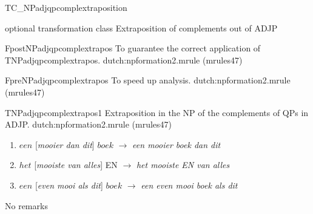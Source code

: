 \begin{mruleclass}{TC\_NPadjqpcomplextraposition}
\begin{classdescr}
\kind optional transformation class
\classtask Extraposition 
of complements out of ADJP 
\classremarks
\begin{filters}

\begin{members}
\begin{member}
 FpostNPadjqpcomplextrapos
 To guarantee the correct application of TNPadjqpcomplextrapos.
\file dutch:npformation2.mrule (mrules47)
\end{member}
\end{members}
\end{filters}
\begin{speedrules}
\begin{members}
\begin{member}
 FpreNPadjqpcomplextrapos
 To speed up analysis.
\file dutch:npformation2.mrule (mrules47)
\end{member}
\end{members}
\end{speedrules}

\noplannedrules

\norulesnotince


\end{classdescr}

\begin{members}
\begin{member}
 TNPadjqpcomplextrapos1
 Extraposition in the NP of the complements of QPs in 
ADJP.
\file dutch:npformation2.mrule (mrules47)
\semantics \nosemantics
\example
\begin{enumerate}
  \item 
$een$ [{\em mooier dan dit}] $boek$
$\rightarrow$
{\em  een mooier boek dan dit}
  \item
$het$ [{\em mooiste van alles}] EN 
$\rightarrow$
{\em het mooiste EN van alles}
  \item
 $een$ [{\em even mooi als dit}] $boek$ 
$\rightarrow$ 
{\em een even mooi boek als dit}
\end{enumerate}
\remarks No remarks
\end{member}
\end{members}
\end{mruleclass}

